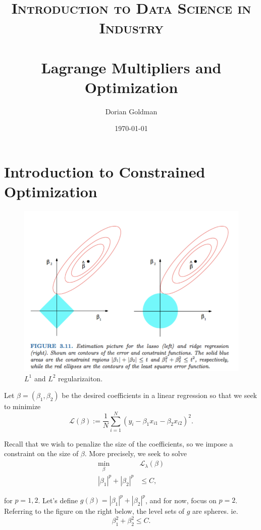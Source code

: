 \documentclass[paper=a4, fontsize=11pt]{scrartcl} %
\title{	
\normalfont \normalsize 
\textsc{Introduction to Data Science in Industry} \\ [25pt] %
\horrule{0.5pt} \\[0.4cm] %
\huge Lagrange Multipliers and Optimization %
\horrule{2pt} \\[0.5cm] %
}
\author{Dorian Goldman} %
\date{\normalsize\today} %
\numberwithin{equation}{section} %
\numberwithin{figure}{section} %
\numberwithin{table}{section} %
\begin{document}
\maketitle %

\section{Introduction to Constrained Optimization}
\begin{figure}
  \includegraphics[width=\linewidth]{../img/regularization.png}
  \caption{$L^1$ and $L^2$ regularizaiton.}
  \label{reg}
  \end{figure}
 
Let $\beta = (\beta_1, \beta_2)$ be the desired coefficients in a linear regression so that we seek to minimize
\begin{equation}
\mathcal{L}(\beta) := \frac{1}{N} \sum_{i=1}^N (y_i - \beta_1 x_{i1} - \beta_2 x_{i2})^2.
\end{equation}

Recall that we wish to penalize the size of the coefficients, so we impose a constraint on the size of $\beta$. More precisely, we seek to solve
\begin{align}
\min_{\beta}\; &\mathcal{L}_{\lambda} (\beta) \\
|\beta_1|^p + |\beta_2|^p &\leq C,
\end{align}

for $p=1, 2$. Let's define $g(\beta) = |\beta_1|^p + |\beta_2|^p$, and for now, focus on $p=2$. Referring to the figure on the right below, the level sets of $g$ are spheres. ie.
\[ \beta_1^2 + \beta_2^2 \leq C.\]
\end{document}
